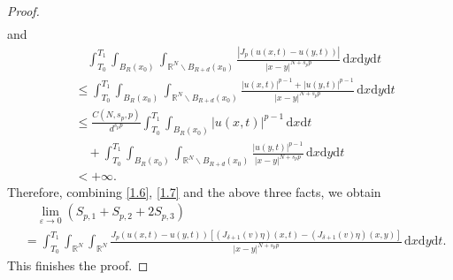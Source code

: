 \documentclass[10pt,a4paper]{amsart}
\begin{document}
\begin{proof}
\begin{align*}
	\end{align*}
	and
	\begin{align*}
		&\quad\int_{T_0}^{T_1}\int_{B_R(x_0)}\int_{\mathbb{R}^N\backslash B_{R+d}(x_0)}\frac{\left| J_p\left(u(x,t)-u(y,t)\right)\right| }{|x-y|^{N+s_pp}}\,\mathrm{d}x\mathrm{d}y\mathrm{d}t\\
		&\le\int_{T_0}^{T_1}\int_{B_R(x_0)}\int_{\mathbb{R}^N\backslash B_{R+d}(x_0)}\frac{|u(x,t)|^{p-1}+|u(y,t)|^{p-1}}{|x-y|^{N+s_pp}}\,\mathrm{d}x\mathrm{d}y\mathrm{d}t\\
		&\le \frac{C(N,s_p,p)}{d^{s_pp}}\int_{T_0}^{T_1}\int_{B_R(x_0)}|u(x,t)|^{p-1}\,\mathrm{d}x\mathrm{d}t\\
		&\quad+\int_{T_0}^{T_1}\int_{B_R(x_0)}\int_{\mathbb{R}^N\backslash B_{R+d}(x_0)}\frac{|u(y,t)|^{p-1}}{|x-y|^{N+s_pp}}\,\mathrm{d}x\mathrm{d}y\mathrm{d}t\\
		&<+\infty.
	\end{align*}
	Therefore, combining \eqref{1.6}, \eqref{1.7} and the above three facts, we obtain
	\begin{align*}
		&\quad\lim\limits_{\varepsilon\rightarrow0}\left( S_{p,1}+S_{p,2}+2S_{p,3}\right)\\
		&=\int_{T_0}^{T_1}\int_{\mathbb{R}^N}\int_{\mathbb{R}^N}\frac{J_p\left( u(x,t)-u(y,t)\right)\left[ \left( J_{\delta+1}(v)\eta\right)(x,t)-\left( J_{\delta+1}(v)\eta\right)(x,y)\right] }{|x-y|^{N+s_pp}}\,\mathrm{d}x\mathrm{d}y\mathrm{d}t.
	\end{align*}
This finishes the proof.
\end{proof}
\end{document}
